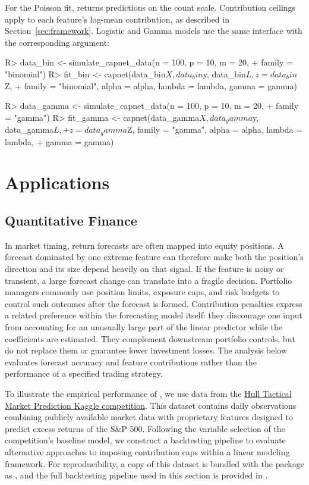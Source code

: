 \documentclass[article,shortnames,nofooter]{jss}
\begin{document}
For the Poisson fit,  returns predictions on the count scale. Contribution ceilings apply to each feature's log-mean contribution, as described in Section~\ref{sec:framework}. Logistic and Gamma models use the same interface with the corresponding  argument:

\begin{Code}
    R> data_bin <- simulate_capnet_data(n = 100, p = 10, m = 20,
    +    family = "binomial")
    R> fit_bin <- capnet(data_bin$X, data_bin$y, data_bin$L, z = data_bin$Z,
    +    family = "binomial", alpha = alpha, lambda = lambda, gamma = gamma)

    R> data_gamma <- simulate_capnet_data(n = 100, p = 10, m = 20,
    +    family = "gamma")
    R> fit_gamma <- capnet(data_gamma$X, data_gamma$y, data_gamma$L,
    +    z = data_gamma$Z, family = "gamma", alpha = alpha, lambda = lambda,
    +    gamma = gamma)
\end{Code}

\section{Applications}\label{sec:examples}

\subsection{Quantitative Finance}\label{sec:examples-finance}

In market timing, return forecasts are often mapped into equity positions. A forecast dominated by one extreme feature can therefore make both the position's direction and its size depend heavily on that signal. If the feature is noisy or transient, a large forecast change can translate into a fragile decision. Portfolio managers commonly use position limits, exposure caps, and risk budgets to control such outcomes after the forecast is formed. Contribution penalties express a related preference within the forecasting model itself: they discourage one input from accounting for an unusually large part of the linear predictor while the coefficients are estimated. They complement downstream portfolio controls, but do not replace them or guarantee lower investment losses. The analysis below evaluates forecast accuracy and feature contributions rather than the performance of a specified trading strategy.

To illustrate the empirical performance of , we use data from the \href{https://www.kaggle.com/competitions/hull-tactical-market-prediction}{Hull Tactical Market Prediction Kaggle competition}. This dataset contains daily observations combining publicly available market data with proprietary features designed to predict excess returns of the S\&P 500. Following the variable selection of the competition’s baseline model, we construct a backtesting pipeline to evaluate alternative approaches to imposing contribution caps within a linear modeling framework. For reproducibility, a copy of this dataset is bundled with the package as , and the full backtesting pipeline used in this section is provided in .
\end{document}
